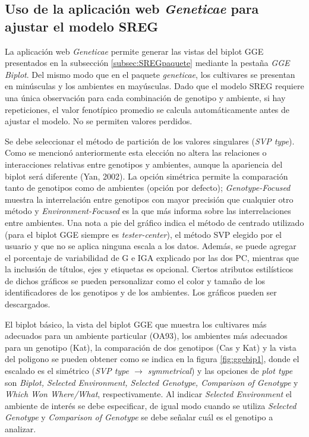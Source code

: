 \subsection{Uso de la aplicación web \emph{Geneticae} para ajustar el modelo SREG}

La aplicación web \emph{Geneticae} permite generar las vistas del biplot GGE presentados en la subsección \ref{subsec:SREGpaquete} mediante la pestaña \emph{GGE Biplot}. Del mismo modo que en el paquete \emph{geneticae}, los cultivares se presentan en minúsculas y los ambientes en mayúsculas. Dado que el modelo SREG requiere una única observación para cada combinación de genotipo y ambiente, si hay repeticiones, el valor fenotípico promedio se calcula automáticamente antes de ajustar el modelo. No se permiten valores perdidos. 

Se debe seleccionar el método de partición de los valores singulares (\emph{SVP type}). Como se mencionó anteriormente esta elección no altera las relaciones o interacciones relativas entre genotipos y ambientes, aunque la apariencia del biplot será diferente (Yan, 2002). La opción simétrica permite la comparación tanto de genotipos como de ambientes (opción por defecto); \emph{Genotype-Focused} muestra la interrelación entre genotipos con mayor precisión que cualquier otro método y \emph{Environment-Focused} es la que más informa sobre las interrelaciones entre ambientes. Una nota a pie del gráfico indica el método de centrado utilizado (para el biplot GGE siempre es \emph{tester-center}), el método SVP elegido por el usuario y que no se aplica ninguna escala a los datos. Además, se puede agregar el porcentaje de variabilidad de G e IGA explicado por las dos PC, mientras que la inclusión de títulos, ejes y etiquetas es opcional. Ciertos atributos estilísticos de dichos gráficos se pueden personalizar como el color y tamaño de los identificadores de los genotipos y de los ambientes. Los gráficos pueden ser descargados.  

El biplot básico, la vista del biplot GGE que muestra los cultivares más adecuados para un ambiente particular (OA93), los ambientes más adecuados para un genotipo (Kat), la comparación de dos genotipos (Cas y Kat) y la vista del poligono se pueden obtener como se indica en la figura \ref{fig:ggebip1}, donde el escalado es el simétrico (\emph{SVP type $\rightarrow$ symmetrical}) y las opciones de \emph{plot type} son \emph{Biplot,
Selected Environment, Selected Genotype, Comparison of Genotype} y \emph{Which Won Where/What}, respectivamente. Al indicar \emph{Selected Environment} el ambiente de interés se debe especificar, de igual modo cuando se utiliza \emph{Selected Genotype} y 
\emph{Comparison of Genotype} se debe señalar cuál es el genotipo a analizar.

